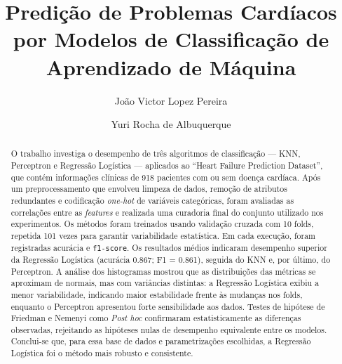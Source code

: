 \documentclass[runningheads]{llncs}
\newcommand{\nonport}[1]{\textit{#1}}
\begin{document}
%
\title{Predição de Problemas Cardíacos por Modelos de Classificação de Aprendizado de Máquina}
%
%
\author{João Victor Lopez Pereira \and
Yuri Rocha de Albuquerque}
%
%
%
\maketitle              %
%
\begin{abstract}

O trabalho investiga o desempenho de três algoritmos de classificação --- KNN, Perceptron e Regressão Logística --- aplicados ao ``Heart Failure Prediction Dataset'', que contém informações clínicas de 918 pacientes com ou sem doença cardíaca. Após um preprocessamento que envolveu limpeza de dados, remoção de atributos redundantes e codificação \nonport{one-hot} de variáveis categóricas, foram avaliadas as correlações entre as \nonport{features} e realizada uma curadoria final do conjunto utilizado nos experimentos. Os métodos foram treinados usando validação cruzada com 10 folds, repetida 101 vezes para garantir variabilidade estatística. Em cada execução, foram registradas acurácia e \texttt{f1-score}. Os resultados médios indicaram desempenho superior da Regressão Logística (acurácia 0.867; F1 = 0.861), seguida do KNN e, por último, do Perceptron. A análise dos histogramas mostrou que as distribuições das métricas se aproximam de normais, mas com variâncias distintas: a Regressão Logística exibiu a menor variabilidade, indicando maior estabilidade frente às mudanças nos folds, enquanto o Perceptron apresentou forte sensibilidade aos dados. Testes de hipótese de Friedman e Nemenyi como \nonport{Post hoc} confirmaram estatisticamente as diferenças observadas, rejeitando as hipóteses nulas de desempenho equivalente entre os modelos. Conclui-se que, para essa base de dados e parametrizações escolhidas, a Regressão Logística foi o método mais robusto e consistente.

\end{abstract}
%
%
\end{document}
